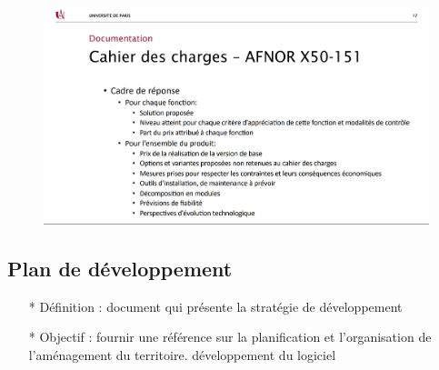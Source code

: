 \documentclass[12pt]{article}
\begin{document}
\begin{figure}[!hbtp]
	\centering
	\includegraphics[scale=0.75]{Capture4.PNG}
\end{figure}
\subsection{Plan de développement}
\begin{itemize}
	\item[* ] Définition : document qui présente la stratégie de développement
	\item[* ] Objectif : fournir une référence sur la planification et l'organisation de l'aménagement du territoire.
	développement du logiciel
\end{itemize}
\end{document}
